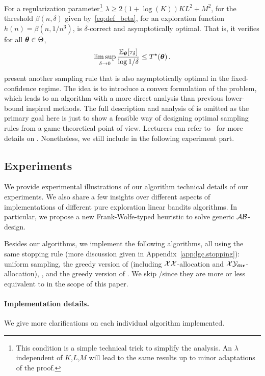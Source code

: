 \begin{theorem}\label{thm:sample_complexity}
For a regularization parameter\footnote{This condition is a simple technical trick to simplify the analysis. An $\lambda$ independent of $K$,$L$,$M$ will lead to the same results up to minor adaptations of the proof.} $\lambda \geq 2(1+\log(K))KL^2+M^2$, for the threshold $\beta(n,\delta)$ given by~\eqref{eq:def_beta}, for an exploration function $h(n)=\beta(n,1/n^3)$, \LG{} is $\delta$-correct and asymptotically optimal. That is, it verifies for all ${\boldsymbol \theta}\in \Theta$,
\begin{align*}
    \limsup_{\delta\to 0}\frac{\mathbb{E}_{\boldsymbol \theta}[\tau_\delta]}{ \log 1/\delta} \le T^{\star}({\boldsymbol \theta}) \,.
\end{align*}
\end{theorem}

\cite{degenne2020game} present another sampling rule \LGC{} that is also asymptotically optimal in the fixed-confidence regime. The idea is to introduce a convex formulation of the problem, which leads to an algorithm with a more direct analysis than previous lower-bound inspired methods. The full description and analysis of \LGC{} is omitted as the primary goal here is just to show a feasible way of designing optimal sampling rules from a game-theoretical point of view. Lecturers can refer to~\cite{degenne2020game} for more details on \LGC{}. Nonetheless, we still include \LGC{} in the following experiment part.

\subsection{Experiments}\label{sec:lgc.game.experiments}

We provide experimental illustrations of our algorithm technical details of our experiments. We also share a few insights over different aspects of implementations of different pure exploration linear bandits algorithms. In particular, we propose a new Frank-Wolfe-typed heuristic to solve generic $\mathcal{A}\mathcal{B}$-design.

Besides our algorithms, we implement the following algorithms, all using the same stopping rule (more discussion given in Appendix~\ref{app:lgc.stopping}): uniform sampling, the greedy version of \XYS (including $\mathcal{X}\mathcal{X}$-allocation and $\mathcal{X}\mathcal{Y}_{\texttt{dir}}$-allocation), \XYA, and the greedy version of \LGapE. We skip \GLUCB/\GLGapE since they are more or less equivalent to \LGapE in the scope of this paper.

\paragraph{Implementation details.}
We give more clarifications on each individual algorithm implemented.

